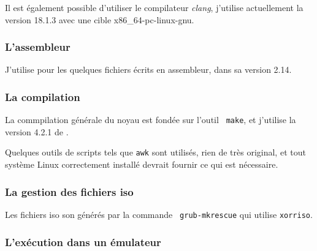    Il est également possible d'utiliser le compilateur \emph{clang},
j'utilise actuellement la version 18.1.3 avec une cible
x86_64-pc-linux-gnu.

%
\subsubsection{L'assembleur}

   J'utilise \nasm \autocite{nasm-website}  pour les quelques fichiers
écrits en assembleur, dans sa version 2.14.
 
%
\subsubsection{La compilation}
\label{subection:compilation}

   La commpilation générale du noyau est fondée sur l'outil {\tt
make}, et j'utilise la version 4.2.1 de .

%

   Quelques outils de scripts tels que {\tt awk} sont utilisés, rien
de très original, et tout système Linux correctement installé devrait
fournir ce qui est nécessaire.

%
\subsubsection{La gestion des fichiers {\sc iso}}

   Les fichiers {\sc iso} son générés par la commande {\tt
     grub-mkrescue} qui utilise {\tt xorriso}.
   
%
\subsubsection{L'exécution dans un émulateur}

